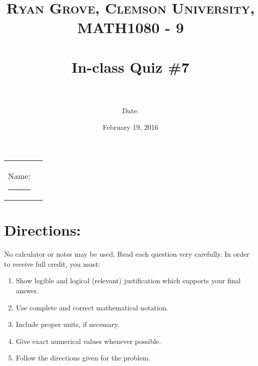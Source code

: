 \documentclass[paper=a4, fontsize=11pt]{scrartcl} %
\title{	
\normalfont \normalsize 
\textsc{Ryan Grove, Clemson University, MATH1080 - 9} \\ [25pt] %
\horrule{0.5pt} \\[0.4cm] %
\huge In-class Quiz \#7 \\ %
\horrule{2pt} \\[0.5cm] %
}
\author{Date:} %
\date{\normalsize February 19, 2016} %
\numberwithin{equation}{section} %
\numberwithin{figure}{section} %
\numberwithin{table}{section} %
\begin{document}
\maketitle %

\begin{flushleft}
\begin{tabular}{l l}
Name: \rule{3.2in}{.01cm}  & {}%
\end{tabular}
\end{flushleft}


\section*{\textbf{Directions:}}

No calculator or notes may be used.  Read each question very carefully.  In order to receive full credit, you must:
\begin{enumerate}
\item Show legible and logical (relevant) justification which supports your final answer.
\item Use complete and correct mathematical notation.
\item Include proper units, if necessary.
\item Give exact numerical values whenever possible.
\item Follow the directions given for the problem.
\end{enumerate}
\vspace{.1in}

\newpage
\end{document}

